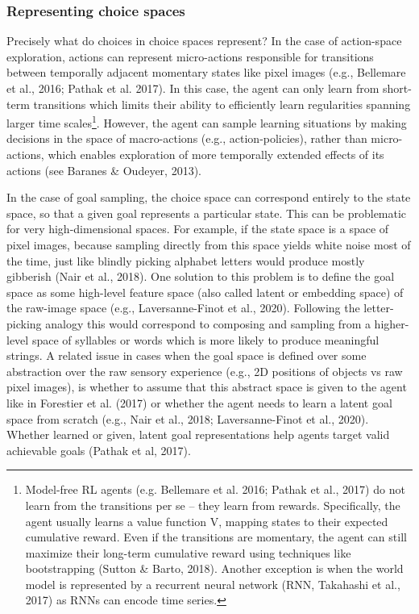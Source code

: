 \subsubsection{Representing choice spaces}
Precisely what do choices in choice spaces represent? In the case of action-space exploration, actions can represent micro-actions responsible for transitions between temporally adjacent momentary states like pixel images (e.g., Bellemare et al., 2016; Pathak et al. 2017). In this case, the agent can only learn from short-term transitions which limits their ability to efficiently learn regularities spanning larger time scales\footnote{Model-free \ac{RL} agents (e.g. Bellemare et al. 2016; Pathak et al., 2017) do not learn from the transitions per se -- they learn from rewards. Specifically, the agent usually learns a value function V, mapping states to their expected cumulative reward. Even if the transitions are momentary, the agent can still maximize their long-term cumulative reward using techniques like bootstrapping (Sutton \& Barto, 2018). Another exception is when the world model is represented by a recurrent neural network (RNN, Takahashi et al., 2017) as RNNs can encode time series.}. However, the agent can sample learning situations by making decisions in the space of macro-actions (e.g., action-policies), rather than micro-actions, which enables exploration of more temporally extended effects of its actions (see Baranes \& Oudeyer, 2013). 

In the case of goal sampling, the choice space can correspond entirely to the state space, so that a given goal represents a particular state. This can be problematic for very high-dimensional spaces. For example, if the state space is a space of pixel images, because sampling directly from this space yields white noise most of the time, just like blindly picking alphabet letters would produce mostly gibberish (Nair et al., 2018). One solution to this problem is to define the goal space as some high-level feature space (also called latent or embedding space) of the raw-image space (e.g., Laversanne-Finot et al., 2020). Following the letter-picking analogy this would correspond to composing and sampling from a higher-level space of syllables or words which is more likely to produce meaningful strings. A related issue in cases when the goal space is defined over some abstraction over the raw sensory experience (e.g., 2D positions of objects vs raw pixel images), is whether to assume that this abstract space is given to the agent like in Forestier et al. (2017) or whether the agent needs to learn a latent goal space from scratch (e.g., Nair et al., 2018; Laversanne-Finot et al., 2020). Whether learned or given, latent goal representations help agents target valid achievable goals (Pathak et al, 2017).

